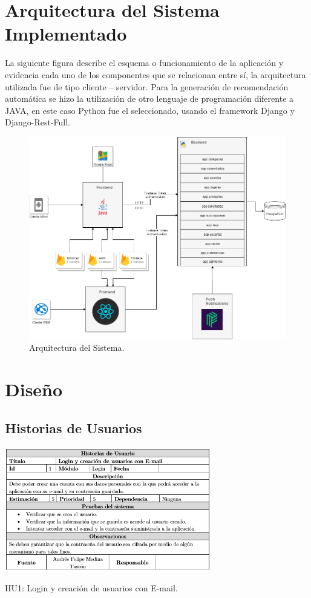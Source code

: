 \documentclass[12pt,letterpaper,openany]{book}
\begin{document}
\section{Arquitectura del Sistema Implementado}
La siguiente figura describe el esquema o funcionamiento de la aplicación y evidencia cada uno de los componentes que se relacionan entre sí, la arquitectura utilizada fue de tipo cliente – servidor. Para la generación de recomendación automática se hizo la utilización de otro lenguaje de programación diferente a JAVA, en este caso Python fue el seleccionado, usando el framework Django y Django-Rest-Full.
\begin{figure}[H]
\begin{center}
\includegraphics[width=13cm]{./imagenes/arquitectura}
\caption{Arquitectura del Sistema.}
\end{center}
\end{figure}

\section{Diseño}
\subsection{Historias de Usuarios}
\begin{table}[H]
\centering
\includegraphics[width=9cm]{./imagenes/HU/HU1}
\caption{HU1: Login y creación de usuarios con E-mail.}
\end{table}
\end{document}

